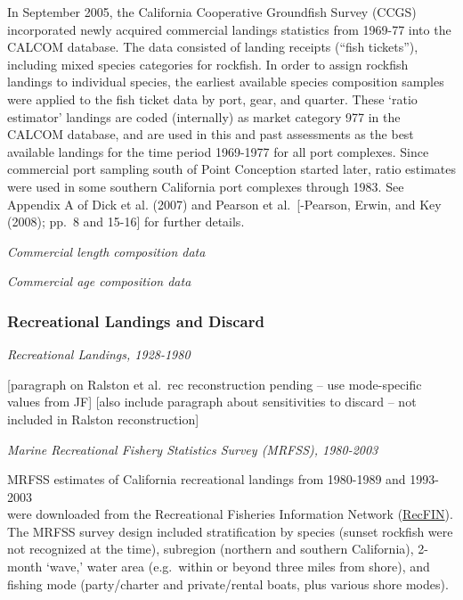 \documentclass[11pt,
  english,
  a4paper,
]{article}
\begin{document}
In September 2005, the California Cooperative Groundfish Survey (CCGS) incorporated newly acquired commercial landings statistics from 1969-77 into the CALCOM database. The data consisted of landing receipts (``fish tickets''), including mixed species categories for rockfish. In order to assign rockfish landings to individual species, the earliest available species composition samples were applied to the fish ticket data by port, gear, and quarter. These `ratio estimator' landings are coded (internally) as market category 977 in the CALCOM database, and are used in this and past assessments as the best available landings for the time period 1969-1977 for all port complexes. Since commercial port sampling south of Point Conception started later, ratio estimates were used in some southern California port complexes through 1983. See Appendix A of Dick et al. {(2007)\leavevmode\tagmcend\tagstructend} and Pearson et al.~{[}-{Pearson, Erwin, and Key (2008)\leavevmode\tagmcend\tagstructend}; pp.~8 and 15-16{]} for further details.

\emph{Commercial length composition data}

\emph{Commercial age composition data}


\hypertarget{recreational-landings-and-discard}{%
\subsubsection{Recreational Landings and Discard}\label{recreational-landings-and-discard}}

\leavevmode\tagmcend\tagstructend

\emph{Recreational Landings, 1928-1980}

{[}paragraph on Ralston et al.~rec reconstruction pending -- use mode-specific values from JF{]} {[}also include paragraph about sensitivities to discard -- not included in Ralston reconstruction{]}

\emph{Marine Recreational Fishery Statistics Survey (MRFSS), 1980-2003}

MRFSS estimates of California recreational landings from 1980-1989 and 1993-2003\\
were downloaded from the Recreational Fisheries Information Network ({\href{https://www.recfin.org/}{RecFIN}\leavevmode\tagmcend\tagstructend}). The MRFSS survey design included stratification by species (sunset rockfish were not recognized at the time), subregion (northern and southern California), 2-month `wave,' water area (e.g.~within or beyond three miles from shore), and fishing mode (party/charter and private/rental boats, plus various shore modes).
\end{document}
